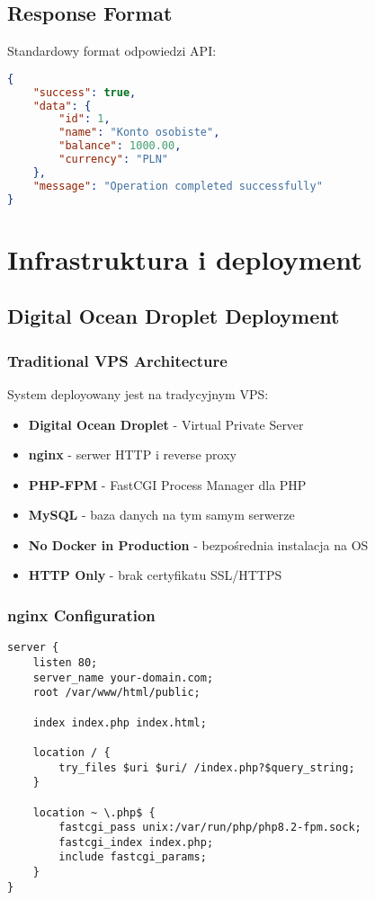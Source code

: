    \subsection{Response Format}

    Standardowy format odpowiedzi API:

    \begin{lstlisting}[language=JSON, caption=Format odpowiedzi API]
{
    "success": true,
    "data": {
        "id": 1,
        "name": "Konto osobiste",
        "balance": 1000.00,
        "currency": "PLN"
    },
    "message": "Operation completed successfully"
}
    \end{lstlisting}

    \section{Infrastruktura i deployment}

    \subsection{Digital Ocean Droplet Deployment}

    \subsubsection{Traditional VPS Architecture}
    System deployowany jest na tradycyjnym VPS:

    \begin{itemize}
        \item \textbf{Digital Ocean Droplet} - Virtual Private Server
        \item \textbf{nginx} - serwer HTTP i reverse proxy
        \item \textbf{PHP-FPM} - FastCGI Process Manager dla PHP
        \item \textbf{MySQL} - baza danych na tym samym serwerze
        \item \textbf{No Docker in Production} - bezpośrednia instalacja na OS
        \item \textbf{HTTP Only} - brak certyfikatu SSL/HTTPS
    \end{itemize}

    \subsubsection{nginx Configuration}

    \begin{lstlisting}[language=nginx, caption=Przykład konfiguracji nginx]
server {
    listen 80;
    server_name your-domain.com;
    root /var/www/html/public;

    index index.php index.html;

    location / {
        try_files $uri $uri/ /index.php?$query_string;
    }

    location ~ \.php$ {
        fastcgi_pass unix:/var/run/php/php8.2-fpm.sock;
        fastcgi_index index.php;
        include fastcgi_params;
    }
}
    \end{lstlisting}

